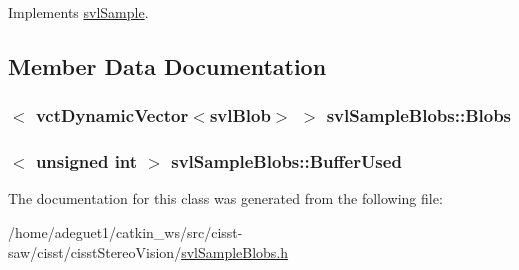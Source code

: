 Implements \hyperlink{classsvl_sample_a10f80eb24f0d8d2eba304dc6e3c46252}{svl\-Sample}.



\subsection{Member Data Documentation}
\hypertarget{classsvl_sample_blobs_a8b3a7c5bd623491b8ce0233e371db2e5}{
\subsubsection[{Blobs}]{$<$ {\bf vct\-Dynamic\-Vector}$<${\bf svl\-Blob}$>$ $>$ svl\-Sample\-Blobs\-::\-Blobs\hspace{0.3cm}{\ttfamily [protected]}}}\label{classsvl_sample_blobs_a8b3a7c5bd623491b8ce0233e371db2e5}
\hypertarget{classsvl_sample_blobs_a4ed2643831150b69245028dd4db73b6d}{
\subsubsection[{Buffer\-Used}]{$<$ unsigned int $>$ svl\-Sample\-Blobs\-::\-Buffer\-Used\hspace{0.3cm}{\ttfamily [protected]}}}\label{classsvl_sample_blobs_a4ed2643831150b69245028dd4db73b6d}


The documentation for this class was generated from the following file\-:\begin{DoxyCompactItemize}
\item 
/home/adeguet1/catkin\-\_\-ws/src/cisst-\/saw/cisst/cisst\-Stereo\-Vision/\hyperlink{svl_sample_blobs_8h}{svl\-Sample\-Blobs.\-h}\end{DoxyCompactItemize}
